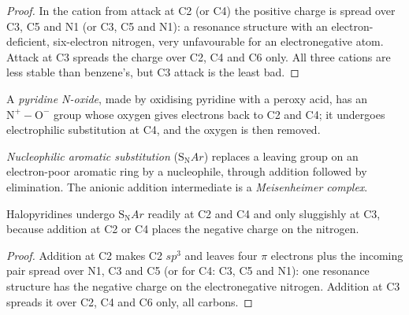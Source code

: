 \begin{proof}
In the cation from attack at C2 (or C4) the positive charge is spread over C3, C5
and N1 (or C3, C5 and N1): a resonance structure with an electron-deficient,
six-electron nitrogen, very unfavourable for an electronegative atom. Attack
at C3 spreads the charge over C2, C4 and C6 only. All three cations are less stable
than benzene's, but C3 attack is the least bad.
\end{proof}

\begin{definition}\label{def:b3:heterocycles:n-oxide}
A \emph{pyridine N-oxide}, made by oxidising pyridine
with a peroxy acid, has an $\mathrm{N^+{-}O^-}$ group whose oxygen gives electrons back to C2
and C4; it undergoes electrophilic substitution at C4, and the oxygen is then
removed.
\end{definition}

\begin{definition}\label{def:b3:heterocycles:snar}
\emph{Nucleophilic aromatic substitution}
($\mathrm S_\mathrm NAr$) replaces a leaving group on an electron-poor aromatic ring
by a nucleophile, through addition followed by elimination. The anionic
addition intermediate is a \emph{Meisenheimer complex}.
\end{definition}

\begin{proposition}\label{prop:b3:heterocycles:snar-positions}
Halopyridines undergo $\mathrm S_\mathrm NAr$ readily at C2 and C4 and only sluggishly at C3,
because addition at C2 or C4 places the negative charge on the nitrogen.
\end{proposition}

\begin{proof}
Addition at C2 makes C2 $sp^3$ and leaves four $\pi$ electrons plus the incoming pair
spread over N1, C3 and C5 (or for C4: C3, C5 and N1): one resonance structure has the
negative charge on the electronegative nitrogen. Addition at C3 spreads it over
C2, C4 and C6 only, all carbons.
\end{proof}

